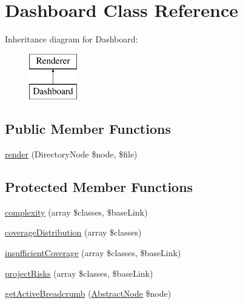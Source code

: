 \hypertarget{class_sebastian_bergmann_1_1_code_coverage_1_1_report_1_1_html_1_1_dashboard}{}\section{Dashboard Class Reference}
\label{class_sebastian_bergmann_1_1_code_coverage_1_1_report_1_1_html_1_1_dashboard}
Inheritance diagram for Dashboard\+:\begin{figure}[H]
\begin{center}
\leavevmode
\includegraphics[height=2.000000cm]{class_sebastian_bergmann_1_1_code_coverage_1_1_report_1_1_html_1_1_dashboard}
\end{center}
\end{figure}
\subsection*{Public Member Functions}
\begin{DoxyCompactItemize}
\item 
\mbox{\hyperlink{class_sebastian_bergmann_1_1_code_coverage_1_1_report_1_1_html_1_1_dashboard_a9d0de8c73a83875e31c34f3dfbbebbc9}{render}} (Directory\+Node \$node, \$file)
\end{DoxyCompactItemize}
\subsection*{Protected Member Functions}
\begin{DoxyCompactItemize}
\item 
\mbox{\hyperlink{class_sebastian_bergmann_1_1_code_coverage_1_1_report_1_1_html_1_1_dashboard_abdbc5f2828af5084b8d43bd90b76aa17}{complexity}} (array \$classes, \$base\+Link)
\item 
\mbox{\hyperlink{class_sebastian_bergmann_1_1_code_coverage_1_1_report_1_1_html_1_1_dashboard_a16b2565136458c23dfc9e1d80173969c}{coverage\+Distribution}} (array \$classes)
\item 
\mbox{\hyperlink{class_sebastian_bergmann_1_1_code_coverage_1_1_report_1_1_html_1_1_dashboard_a363be17508d4274fea6f3649e385a571}{insufficient\+Coverage}} (array \$classes, \$base\+Link)
\item 
\mbox{\hyperlink{class_sebastian_bergmann_1_1_code_coverage_1_1_report_1_1_html_1_1_dashboard_aa9ae268b38b92c6734cfa9ebd9bad575}{project\+Risks}} (array \$classes, \$base\+Link)
\item 
\mbox{\hyperlink{class_sebastian_bergmann_1_1_code_coverage_1_1_report_1_1_html_1_1_dashboard_a6b2c52557e1f5e4283ad48cfcf85ee9c}{get\+Active\+Breadcrumb}} (\mbox{\hyperlink{class_sebastian_bergmann_1_1_code_coverage_1_1_node_1_1_abstract_node}{Abstract\+Node}} \$node)
\end{DoxyCompactItemize}
